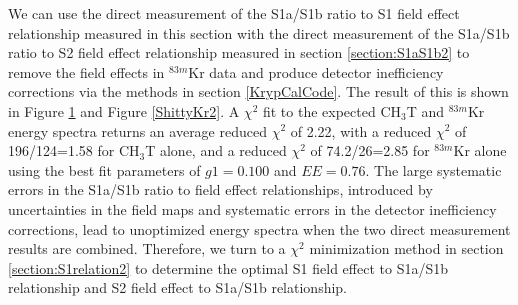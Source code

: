We can use the direct measurement of the S1a/S1b ratio to S1 field effect relationship measured in this section with the direct measurement of the S1a/S1b ratio to S2 field effect relationship measured in section \ref{section:S1aS1b2} to remove the field effects in $^{83m}$Kr data and produce detector inefficiency corrections via the methods in section \ref{KrypCalCode}.  The result of this is shown in Figure \ref{ShittyCH3T2} and Figure \ref{ShittyKr2}.  A $\chi^2$ fit to the expected CH$_3$T and $^{83m}$Kr energy spectra returns an average reduced $\chi^2$ of 2.22, with a reduced $\chi^2$ of 196/124=1.58 for CH$_3$T alone, and a reduced $\chi^2$ of 74.2/26=2.85 for $^{83m}$Kr alone using the best fit parameters of $g1=0.100$ and $EE=0.76$.  The large systematic errors in the S1a/S1b ratio to field effect relationships, introduced by uncertainties in the field maps and systematic errors in the detector inefficiency corrections, lead to unoptimized energy spectra when the two direct measurement results are combined.  Therefore, we turn to a $\chi^2$ minimization method in section \ref{section:S1relation2} to determine the optimal S1 field effect to S1a/S1b relationship and S2 field effect to S1a/S1b relationship.



\begin{figure} [!h]
\centering
{}
\qquad
{}
\label{ShittyCH3T2}
\end{figure}

